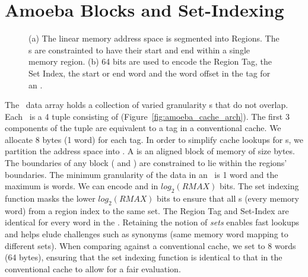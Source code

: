 \section{Amoeba Blocks and Set-Indexing}


\begin{figure}[h]
  \caption[Memory Regions]{ (a) The linear memory address space is segmented into Regions. The \AB{}s are constrainted to have their start and end within a single memory region. (b) 64 bits are used to encode the Region Tag, the Set Index, the start or end word and the word offset in the tag for an \AB{}.  }
  \label{fig:mem_region_addr}
\end{figure}


The \AC\ data array holds a collection of varied granularity \AB{}s that do not overlap. Each \AB\ is a 4 tuple consisting of  (Figure~\ref{fig:amoeba_cache_arch}). The first 3 components of the tuple are equivalent to a tag in a conventional cache. We allocate 8 bytes (1 word) for each tag. In order to simplify cache lookups for \AB{}s, we partition the address space into . A  is an aligned block of memory of size  bytes. The boundaries of any \AB{} block ( and ) are constrained to lie within the regions' boundaries. The minimum granularity of the data in an \AB\ is 1 word and the maximum is  words. We can encode  and  in $log_2(RMAX)$ bits. The set indexing function masks the lower $log_2(RMAX)$ bits to ensure that all \AB{}s (every memory word) from a region index to the same set. The Region Tag and Set-Index are identical for every word in the \AB{}. Retaining the notion of \textit{sets} enables fast lookups and helps elude challenges such as synonyms (same memory word mapping to different sets). When comparing against a conventional cache, we set  to 8 words (64 bytes), ensuring that the set indexing function is identical to that in the conventional cache to allow for a fair evaluation.



